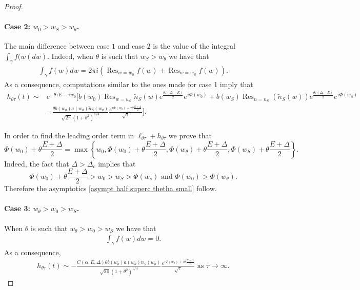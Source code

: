 \documentclass{article}
\numberwithin{equation}{section}
\theoremstyle{plain}
\begin{document}
\begin{proof}
\paragraph{Case 2: $w_0 > w_S > w_\theta   $. }
The main difference between case $1$ and case $2$ is the value of the integral $\int_\gamma f(w( dw ) $. 
Indeed, when  $\theta $ is such that $w_S > w_\theta $ we have that 
\begin{align*}
 \int_{\gamma} f(w) dw=  2 \pi i \left( \operatorname{Res}_{w=w_0} f(w)+ \operatorname{Res}_{w=w_S} f(w) \right) . 
\end{align*}
As a consequence, computations similar to the ones made for case 1 imply that 
\begin{align*}
        h_{\theta \tau } (t)\sim &e^{ - \theta \tau E - \tau w_0 } [   b(w_0)  \operatorname{Res}_{w=w_0} \tilde{n}_S (w) e^{ \frac{ \theta \tau (\Delta - E) }{2}}  e^{\tau   \Phi(w_0)} +b(w_S) \operatorname{Res}_{n=n_S} \left(\tilde{n}_S (w ) \right) e^{ \frac{ \theta \tau (\Delta - E) }{2}}  e^{\tau   \Phi(w_S)} \\
        &
        - \frac{  \theta  b(w_\theta)   a(w_\theta ) \tilde{n}_S(w_\theta )}{\sqrt{2 \pi } (1+\theta^2)^{1/4}} \frac{ e^{ \tau \Phi(w_\theta ) + \tau\theta  \frac{E+ \Delta}{2}}}{\sqrt{\tau}}].
\end{align*}



In order to find the leading order term in $\ell_{\theta \tau } + h_{\theta \tau }$
 we prove that
\begin{equation}\label{comparison 2.b}
\Phi(w_0) + \theta\frac{E+ \Delta }{2}=\max\left\{ w_0 , \Phi(w_0) + \theta\frac{E+ \Delta }{2}, \Phi(w_\theta) + \theta \frac{E+ \Delta }{2}, \Phi(w_S) + \theta\frac{E+ \Delta }{2}  \right\}.
\end{equation}
Indeed, the fact that $\Delta > \Delta_c$ implies that 
\[
\Phi(w_0) +\theta\frac{E+ \Delta }{2} >w_0 > w_S > \Phi(w_s) \text{ and }  \Phi(w_0)> \Phi(w_\theta).
\]
Therefore the asymptotics \eqref{asympt half superc thetha small} follow. 

\paragraph{Case 3: $w_\theta  > w_0 > w_S   $. }
When  $\theta $ is such that $ w_\theta  > w_0 > w_S  $ we have that 
\begin{align*}
 \int_{\gamma} f(w) dw= 0. 
\end{align*}
As a consequence, 
\begin{align*}
        h_{\theta \tau } (t)\sim 
        - \frac{ C(\alpha, E, \Delta)  \theta  b(w_\theta)   a(w_\theta ) \tilde{n}_S(w_\theta )}{\sqrt{2 \pi } (1+\theta^2)^{1/4}} \frac{ e^{ \tau \Phi(w_\theta ) + \tau\theta  \frac{E+ \Delta}{2}}}{\sqrt{\tau}} \text{ as } \tau \to \infty. 
\end{align*}


\end{proof}
\end{document}
